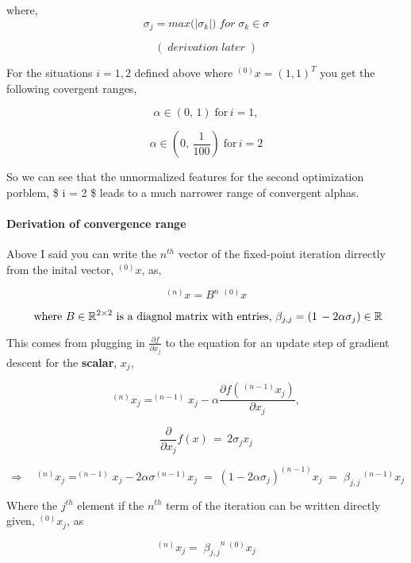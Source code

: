 \documentclass[11pt]{article}
\begin{document}
where, \[
\sigma_j = max \Big( |\sigma_k| \Big) \; for \; \sigma_k \in \sigma
\]

\[ (\; derivation \; later \;) \]

    For the situations \(i=1,2\) defined above where \(^{(0)}x = (1,1)^T\)
you get the following covergent ranges,

\[
 \alpha \in (0, \, 1 ) \; \text{for} \, i = 1,
\]

\[
 \alpha \in (0, \, \frac{1}{100} ) \; \text{for} \, i = 2
\]

So we can see that the unnormalized features for the second optimization
porblem, \$ i = 2 \$ leads to a much narrower range of convergent
alphas.

    \hypertarget{derivation-of-convergence-range}{%
\paragraph{Derivation of convergence
range}\label{derivation-of-convergence-range}}

    Above I said you can write the \(n^{th}\) vector of the fixed-point
iteration dirrectly from the inital vector, \(^{(0)}x\), as,

\begin{equation} \tag{2}
^{(n)}x = B^n \; ^{(0)}x
\end{equation}

\[
\\
\text{ where $B \in \mathbb{R}^{2 \times 2}$ is a diagnol matrix with entries, } \\
\\
\beta_{j,j} = (1 \, - 2 \alpha \sigma_j ) \in \mathbb{R}
\]

    This comes from plugging in \(\frac{\partial f}{\partial x_j}\) to the
equation for an update step of gradient descent for the \textbf{scalar},
\(x_j\),

\[
^{(n)}x_j = ^{(n-1)}x_j - \alpha  \frac{\partial f(\,^{(n-1)}x_j)}{\partial x_j},
\]

\[
\frac{\partial }{\partial x_j} f(x) \, = \, 2 \sigma_{j} x_{j}
\]

    \[
\Rightarrow \quad ^{(n)}x_j = ^{(n-1)}x_j - 2 \alpha \sigma ^{(n-1)} x_j \; = \; (1 - 2 \alpha \sigma_j) ^{(n-1)} x_j \; = \; \beta_{j,j} \, ^{(n-1)} x_j
\]

Where the \(j^{th}\) element if the \(n^{th}\) term of the iteration can
be written directly given, \(^{(0)}x_j\), as

\[
^{(n)}x_j = \; {\beta_{j,j}}^n \, ^{(0)} x_j
\]
\end{document}

